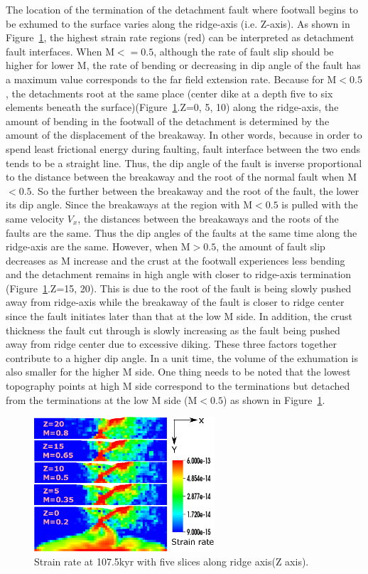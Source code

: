 The location of the termination of the detachment fault where footwall begins to be exhumed to the surface varies along the ridge-axis (i.e. Z-axis). As shown in Figure~\ref{fig_Results1_2}, the highest strain rate regions (red) can be interpreted as detachment fault interfaces. When M$<=0.5$, although the rate of fault slip should be higher for lower M, the rate of bending or decreasing in dip angle of the fault has a maximum value corresponds to the far field extension rate. Because for M$<0.5$, the detachments root at the same place (center dike at a depth five to six elements beneath the surface)(Figure~\ref{fig_Results1_2}.Z=0, 5, 10) along the ridge-axis, the amount of bending in the footwall of the detachment is determined by the amount of the displacement of the breakaway. In other words, because in order to spend least frictional energy during faulting, fault interface between the two ends tends to be a straight line. Thus, the dip angle of the fault is inverse proportional to the distance between the breakaway and the root of the normal fault when M$<0.5$. So the further between the breakaway and the root of the fault, the lower its dip angle. Since the breakaways at the region with M$<0.5$ is pulled with the same velocity $V_{x}$, the distances between the breakaways and the roots of the faults are the same. Thus the dip angles of the faults at the same time along the ridge-axis are the same. However, when M$>0.5$, the amount of fault slip decreases as M increase and the crust at the footwall experiences less bending and the detachment remains in high angle with closer to ridge-axis termination (Figure~\ref{fig_Results1_2}.Z=15, 20). This is due to the root of the fault is being slowly pushed away from ridge-axis while the breakaway of the fault is closer to ridge center since the fault initiates later than that at the low M side. In addition, the crust thickness the fault cut through is slowly increasing as the fault being pushed away from ridge center due to excessive diking. These three factors together contribute to a higher dip angle. In a unit time, the volume of the exhumation is also smaller for the higher M side. One thing needs to be noted that the lowest topography points at high M side correspond to the terminations but detached from the terminations at the low M side (M$<0.5$) as shown in Figure~\ref{fig_Results1_2}.        

\begin{figure}[hc]
  \centering
    \includegraphics[width=0.6\textwidth]{fig_Results1_2.eps}
  \caption{Strain rate at 107.5kyr with five slices along ridge axis(Z axis).}
 \label{fig_Results1_2}
\end{figure}   



